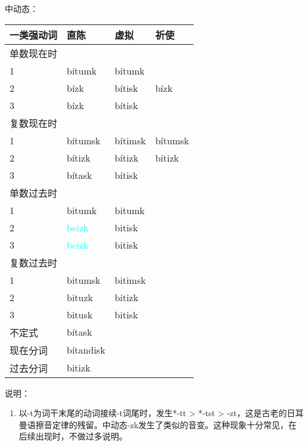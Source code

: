 中动态：

\begin{longtable}{llll}
    \toprule
    一类强动词 & 直陈                    & 虚拟    & 祈使    \\
    \midrule
    \endhead
    \bottomrule
    \endfoot
    单数现在时 &                         &         &         \\
    1          & bítumk                  & bítumk  &         \\
    2          & bízk                    & bítisk  & bízk    \\
    3          & bízk                    & bítisk  &         \\
    复数现在时 &                         &         &         \\
    1          & bítumsk                 & bítimsk & bítumsk \\
    2          & bítizk                  & bítizk  & bítizk  \\
    3          & bítask                  & bítisk  &         \\
    单数过去时 &                         &         &         \\
    1          & bitumk                  & bitumk  &         \\
    2          & \textcolor{cyan}{beizk} & bitisk  &         \\
    3          & \textcolor{cyan}{beizk} & bitisk  &         \\
    复数过去时 &                         &         &         \\
    1          & bitumsk                 & bitimsk &         \\
    2          & bituzk                  & bitizk  &         \\
    3          & bitusk                  & bitisk  &         \\
    不定式     & bítask                  &         &         \\
    现在分词   & bítandisk               &         &         \\
    过去分词   & bitizk                  &         &         \\
\end{longtable}

说明：

\begin{enumerate}
    \item
          以-t为词干末尾的动词接续-t词尾时，发生*-tt > *-tst
          >
          -zt，这是古老的日耳曼语擦音定律的残留。中动态-zk发生了类似的音变。这种现象十分常见，在后续出现时，不做过多说明。
\end{enumerate}

